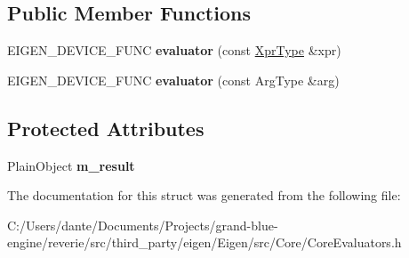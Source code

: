 \subsection*{Public Member Functions}
\begin{DoxyCompactItemize}
\item 
\mbox{\label{struct_eigen_1_1internal_1_1evaluator_3_01_eval_to_temp_3_01_arg_type_01_4_01_4_a61d507b4e4d9bd8654718dbfaffb5214}} 
E\+I\+G\+E\+N\+\_\+\+D\+E\+V\+I\+C\+E\+\_\+\+F\+U\+NC {\bfseries evaluator} (const \mbox{\hyperlink{class_eigen_1_1internal_1_1_eval_to_temp}{Xpr\+Type}} \&xpr)
\item 
\mbox{\label{struct_eigen_1_1internal_1_1evaluator_3_01_eval_to_temp_3_01_arg_type_01_4_01_4_a2bc9d547a2c72e14eeca64edbeb1c303}} 
E\+I\+G\+E\+N\+\_\+\+D\+E\+V\+I\+C\+E\+\_\+\+F\+U\+NC {\bfseries evaluator} (const Arg\+Type \&arg)
\end{DoxyCompactItemize}
\subsection*{Protected Attributes}
\begin{DoxyCompactItemize}
\item 
\mbox{\label{struct_eigen_1_1internal_1_1evaluator_3_01_eval_to_temp_3_01_arg_type_01_4_01_4_ae408b6313445dcccd8be5dc588e6f88b}} 
Plain\+Object {\bfseries m\+\_\+result}
\end{DoxyCompactItemize}


The documentation for this struct was generated from the following file\+:\begin{DoxyCompactItemize}
\item 
C\+:/\+Users/dante/\+Documents/\+Projects/grand-\/blue-\/engine/reverie/src/third\+\_\+party/eigen/\+Eigen/src/\+Core/Core\+Evaluators.\+h\end{DoxyCompactItemize}
